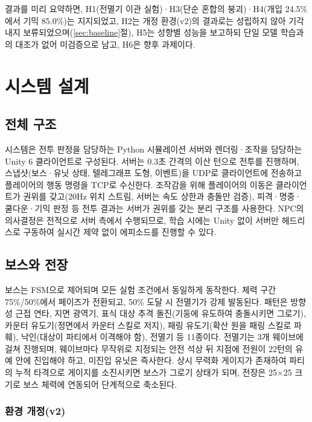 \documentclass[12pt]{article}      %
\begin{document}
결과를 미리 요약하면, H1(전멸기 이관 실험)·H3(단순 혼합의 붕괴)·H4(개입
24.5\%에서 기믹 85.0\%)는 지지되었고, H2는 개정 환경(v2)의 결과로는 성립하지
않아 기각 내지 보류되었으며(\ref{sec:baseline}절), H5는 성향별 성능을 보고하되
단일 모델 학습과의 대조가 없어 미검증으로 남고, H6은 향후 과제이다.

\section{시스템 설계}

\subsection{전체 구조}

시스템은 전투 판정을 담당하는 Python 시뮬레이션 서버와 렌더링·조작을 담당하는
Unity 6 클라이언트로 구성된다. 서버는 0.3초 간격의 이산 턴으로 전투를 진행하며,
스냅샷(보스·유닛 상태, 텔레그래프 도형, 이벤트)을 UDP로 클라이언트에 전송하고
플레이어의 행동 명령을 TCP로 수신한다. 조작감을 위해 플레이어의 이동은
클라이언트가 권위를 갖고(20Hz 위치 스트림, 서버는 속도 상한과 충돌만 검증),
피격·명중·쿨다운·기믹 판정 등 전투 결과는 서버가 권위를 갖는 분리 구조를
사용한다. NPC의 의사결정은 전적으로 서버 측에서 수행되므로, 학습 시에는 Unity
없이 서버만 헤드리스로 구동하여 실시간 제약 없이 에피소드를 진행할 수 있다.

\subsection{보스와 전장}

보스는 FSM으로 제어되며 모든 실험 조건에서 동일하게 동작한다. 체력 구간
75\%/50\%에서 페이즈가 전환되고, 50\% 도달 시 전멸기가 강제 발동된다. 패턴은
방향성 근접 연타, 지면 광역기, 표식 대상 추격 돌진(기둥에 유도하여 충돌시키면
그로기), 카운터 유도기(정면에서 카운터 스킬로 저지), 패링 유도기(확산 원을 패링
스킬로 파훼), 낙인(대상이 파티에서 이격해야 함), 전멸기 등 11종이다. 전멸기는 3개
웨이브에 걸쳐 진행되며, 웨이브마다 무작위로 지정되는 안전 석상 뒤 지점에 전원이
22턴의 유예 안에 진입해야 하고, 미진입 유닛은 즉사한다. 상시 무력화 게이지가
존재하여 파티의 누적 타격으로 게이지를 소진시키면 보스가 그로기 상태가 되며,
전장은 25$\times$25 크기로 보스 체력에 연동되어 단계적으로 축소된다.

\subsubsection{환경 개정(v2)}
\end{document}
